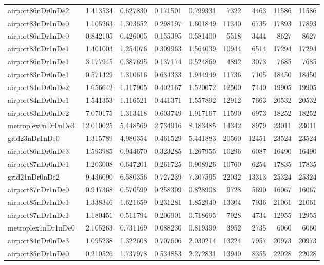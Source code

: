 \begin{longtable}{|l|r|r|r|r|r|r|r|r|}
airport86nDr0nDe2 & 1.413534 & 0.627830 & 0.171501 & 0.799331 & 7322 & 4463 & 11586 & 11586 \\
airport83nDr1nDe0 & 1.105263 & 1.303652 & 0.298197 & 1.601849 & 11340 & 6735 & 17893 & 17893 \\
airport86nDr1nDe0 & 0.842105 & 0.426005 & 0.155395 & 0.581400 & 5518 & 3444 & 8627 & 8627 \\
airport83nDr1nDe1 & 1.401003 & 1.254076 & 0.309963 & 1.564039 & 10944 & 6514 & 17294 & 17294 \\
airport86nDr1nDe1 & 3.177945 & 0.387695 & 0.137174 & 0.524869 & 4892 & 3073 & 7685 & 7685 \\
airport83nDr0nDe1 & 0.571429 & 1.310616 & 0.634333 & 1.944949 & 11736 & 7105 & 18450 & 18450 \\
airport84nDr0nDe2 & 1.656642 & 1.117905 & 0.402167 & 1.520072 & 12500 & 7440 & 19905 & 19905 \\
airport84nDr0nDe1 & 1.541353 & 1.116521 & 0.441371 & 1.557892 & 12912 & 7663 & 20532 & 20532 \\
airport83nDr0nDe2 & 7.070175 & 1.313418 & 0.603749 & 1.917167 & 11590 & 6973 & 18252 & 18252 \\
metroplex0nDr0nDe3 & 12.010025 & 5.448569 & 2.734916 & 8.183485 & 14342 & 8979 & 23011 & 23011 \\
grid23nDr1nDe0 & 1.315789 & 4.980354 & 0.461529 & 5.441883 & 20560 & 12451 & 23524 & 23524 \\
airport86nDr0nDe3 & 1.593985 & 0.944670 & 0.323285 & 1.267955 & 10296 & 6087 & 16490 & 16490 \\
airport87nDr0nDe1 & 1.203008 & 0.647201 & 0.261725 & 0.908926 & 10760 & 6254 & 17835 & 17835 \\
grid21nDr0nDe2 & 9.436090 & 6.580356 & 0.727239 & 7.307595 & 22032 & 13313 & 25324 & 25324 \\
airport87nDr1nDe0 & 0.947368 & 0.570599 & 0.258309 & 0.828908 & 9728 & 5690 & 16067 & 16067 \\
airport85nDr1nDe1 & 1.338346 & 1.621659 & 0.231281 & 1.852940 & 13304 & 7936 & 21061 & 21061 \\
airport87nDr1nDe1 & 1.180451 & 0.511794 & 0.206901 & 0.718695 & 7928 & 4734 & 12955 & 12955 \\
metroplex1nDr1nDe0 & 2.105263 & 0.731169 & 0.088230 & 0.819399 & 3952 & 2735 & 6060 & 6060 \\
airport84nDr0nDe3 & 1.095238 & 1.322608 & 0.707606 & 2.030214 & 13224 & 7957 & 20973 & 20973 \\
airport85nDr1nDe0 & 0.210526 & 1.737978 & 0.534853 & 2.272831 & 13940 & 8355 & 22028 & 22028 \\

\end{longtable}
